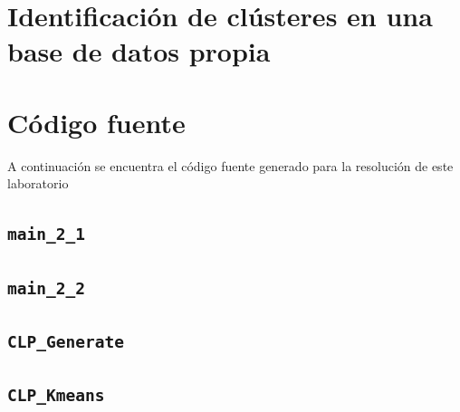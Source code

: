 \documentclass[11pt]{article} %
\begin{document}
\clearpage
\restoregeometry

\section{Identificación de clústeres en una base de datos propia}

\clearpage

\section{Código fuente}
\label{sec:src_code}

A continuación se encuentra el código fuente generado para la resolución de
este laboratorio

\subsection{\texttt{main\_2\_1}}
\label{src:main:21}



\subsection{\texttt{main\_2\_2}}
\label{src:main:22}



\subsection{\texttt{CLP\_Generate}}
\label{src:fun:generate}



\subsection{\texttt{CLP\_Kmeans}}
\label{src:fun:kmeans}


\end{document}
